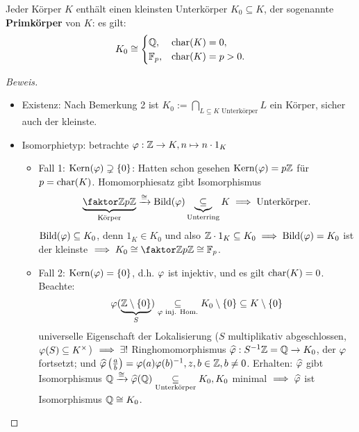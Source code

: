 \documentclass[a4paper]{report}
\begin{document}
\begin{prop}
  Jeder Körper $K$ enthält einen kleinsten Unterkörper $K_{0} \subseteq K$, der sogenannte \textbf{Primkörper} von $K$: es gilt:
  \[K_{0} \cong \begin{cases}\mathbb{Q}, & \operatorname{char}(K) = 0, \\ \mathbb{F}_p, & \operatorname{char}(K) = p > 0.
            \end{cases}\]
          \begin{proof}[Beweis]\item
            \begin{itemize}
            \item Existenz: Nach Bemerkung 2 ist \(K_{0}:= \bigcap_{L \subseteq K \text{ Unterkörper}}L\) ein Körper, sicher auch der kleinste.
              \item Isomorphietyp: betrachte $\varphi: \mathbb{Z} \to K, n \mapsto n \cdot 1_{K}$
                    \begin{itemize}
                        \item Fall 1: $\operatorname{Kern}(\varphi) \supsetneq \{0\}$: Hatten schon gesehen $\operatorname{Kern}(\varphi) = p\mathbb{Z}$ für $p = \operatorname{char} (K)$. Homomorphiesatz gibt Isomorphismus
                            \[\ubr{\fak \Z{p\Z}}_{\text{Körper}} \xrightarrow{\cong} \bil(\ph) \ubr{\subseteq}_{\text{Unterring}}K \imp \text{Unterkörper.}\]
                            $\operatorname{Bild}(\varphi) \subseteq K_{0}$, denn $1_{K} \in K_{0}$ und also $\mathbb{Z}\cdot 1_{K} \subseteq K_{0} \implies \operatorname{Bild}(\varphi) = K_{0}$ ist der kleinste $\imp K_{0} \cong \fak \Z{p\Z} \cong \Fp$.
                      \item Fall 2: $\operatorname{Kern}(\varphi) = \{0\}$, d.h. $\varphi$ ist injektiv, und es gilt $\operatorname{char}(K) = 0$. Beachte:
                            \[\varphi(\underbrace{\mathbb{Z} \setminus \{0\}}_{S}) \underset{\varphi \text{ inj. Hom.}}\subseteq K_{0} \setminus \{0\} \subseteq K \setminus \{0\}\]
                            universelle Eigenschaft der Lokalisierung ($S$ multiplikativ abgeschlossen, $\varphi(S) \subseteq K^\times$) $\implies \exists!$ Ringhomomorphismus $\widehat {\varphi} : S^{-1}\mathbb{Z} = \mathbb{Q} \to K_{0}$, der $\varphi$ fortsetzt; und $\widehat {\varphi} \left(\frac ab\right) = \varphi(a)\varphi(b)^{-1}, z, b \in \mathbb{Z}, b \ne 0$. Erhalten: $\widehat {\varphi}$ gibt Isomorphismus $\mathbb{Q} \xrightarrow{\cong} \widehat {\varphi}(\mathbb{Q}) \underset{\text{Unterkörper}}\subseteq K_{0}, K_{0}$ minimal $\implies \widehat {\varphi}$ ist Isomorphismus $\mathbb{Q} \cong K_{0}$.\qedhere
                    \end{itemize}
            \end{itemize}
          \end{proof}
\end{prop}
\end{document}
